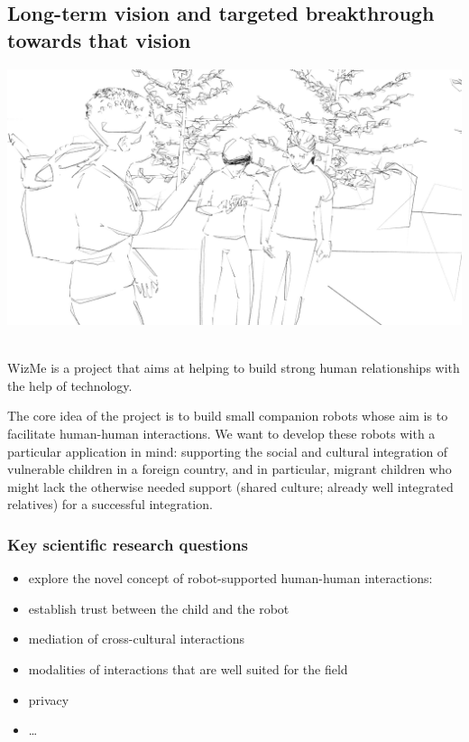 \documentclass[]{article}
\begin{document}
\subsection{Long-term vision and targeted breakthrough towards that
vision}\label{long-term-vision-and-targeted-breakthrough-towards-that-vision}

\includegraphics{figs/render5.png}~

WizMe is a project that aims at helping to build strong human
relationships with the help of technology.

The core idea of the project is to build small companion robots whose
aim is to facilitate human-human interactions. We want to develop these
robots with a particular application in mind: supporting the social and
cultural integration of vulnerable children in a foreign country, and in
particular, migrant children who might lack the otherwise needed support
(shared culture; already well integrated relatives) for a successful
integration.

\subsubsection{Key scientific research
questions}\label{key-scientific-research-questions}

\begin{itemize}

\item
  explore the novel concept of robot-supported human-human interactions:
\item
  establish trust between the child and the robot
\item
  mediation of cross-cultural interactions
\item
  modalities of interactions that are well suited for the field
\item
  privacy
\item
  \ldots{}
\end{itemize}
\end{document}
